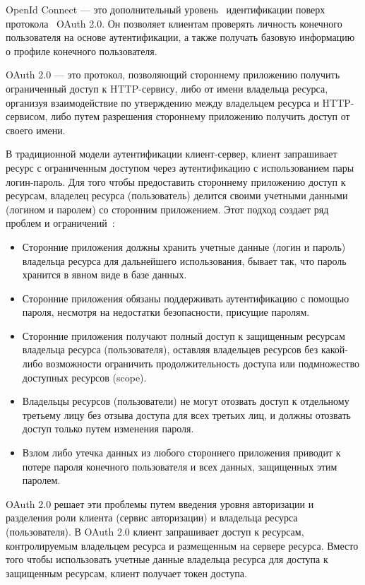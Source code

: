 OpenId Connect — это дополнительный уровень~\cite{siriwardenaOpenid2020, sakimuraOpenid2014} идентификации поверх
протокола~\cite{hardt2012oauth} OAuth 2.0.
Он позволяет клиентам проверять личность конечного пользователя на основе аутентификации,
а также получать базовую информацию о профиле конечного пользователя.

OAuth 2.0 — это протокол, позволяющий стороннему приложению получить ограниченный доступ к HTTP-сервису, либо от имени
владельца ресурса, организуя взаимодействие по утверждению между владельцем ресурса и HTTP-сервисом, либо путем разрешения
стороннему приложению получить доступ от своего имени.

В традиционной модели аутентификации клиент-сервер, клиент запрашивает ресурс с ограниченным доступом
через аутентификацию с использованием пары логин-пароль.
Для того чтобы предоставить стороннему приложению доступ к ресурсам,
владелец ресурса (пользователь) делится своими учетными данными (логином и паролем) со сторонним приложением.
Этот подход создает ряд проблем и ограничений~\cite{hardt2012oauth}:
\begin{itemize}
    \item Сторонние приложения должны хранить учетные данные (логин и пароль) владельца ресурса для дальнейшего использования,
    бывает так, что пароль хранится в явном виде в базе данных.
    \item Сторонние приложения обязаны поддерживать аутентификацию с помощью пароля, несмотря на недостатки безопасности,
    присущие паролям.
    \item Сторонние приложения получают полный доступ к защищенным ресурсам владельца ресурса (пользователя),
    оставляя владельцев ресурсов без какой-либо возможности ограничить продолжительность доступа или подмножество
    доступных ресурсов (scope).
    \item Владельцы ресурсов (пользователи) не могут отозвать доступ к отдельному третьему лицу без отзыва доступа для всех
    третьих лиц, и должны отозвать доступ только путем изменения пароля.
    \item Взлом либо утечка данных из любого стороннего приложения приводит к потере пароля конечного пользователя и
    всех данных, защищенных этим паролем.
\end{itemize}

OAuth 2.0 решает эти проблемы путем введения уровня авторизации и разделения роли клиента (сервис авторизации) и
владельца ресурса (пользователя).
В OAuth 2.0 клиент запрашивает доступ к ресурсам, контролируемым владельцем ресурса и размещенным на сервере ресурса.
Вместо того чтобы использовать учетные данные владельца ресурса для доступа к защищенным ресурсам, клиент получает токен доступа.

